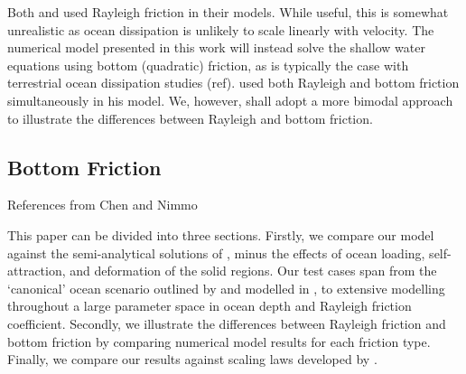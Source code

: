 Both \citet{tyler2011tidal} and \citet{matsuyama2014tidal} used Rayleigh friction in their models. While useful, this is somewhat unrealistic as ocean dissipation is unlikely to scale linearly with velocity. The numerical model presented in this work will instead solve the shallow water equations using bottom (quadratic) friction, as is typically the case with terrestrial ocean dissipation studies (ref). \citet{sears1995tidal} used both Rayleigh and bottom friction simultaneously in his model. We, however, shall adopt a more bimodal approach to illustrate the differences between Rayleigh and bottom friction. 

\subsection{Bottom Friction}

References from Chen and Nimmo


This paper can be divided into three sections. Firstly, we compare our model against the semi-analytical solutions of \citet{matsuyama2014tidal}, minus the effects of ocean loading, self-attraction, and deformation of the solid regions. Our test cases span from the `canonical' ocean scenario outlined by \citet{sagan1982tide} and modelled in \citet{sears1995tidal}, to extensive modelling throughout a large parameter space in ocean depth and Rayleigh friction coefficient. Secondly, we illustrate the differences between Rayleigh friction and bottom friction by comparing numerical model results for each friction type. Finally, we compare our results against scaling laws developed by \citep{chen2013tidal}.




